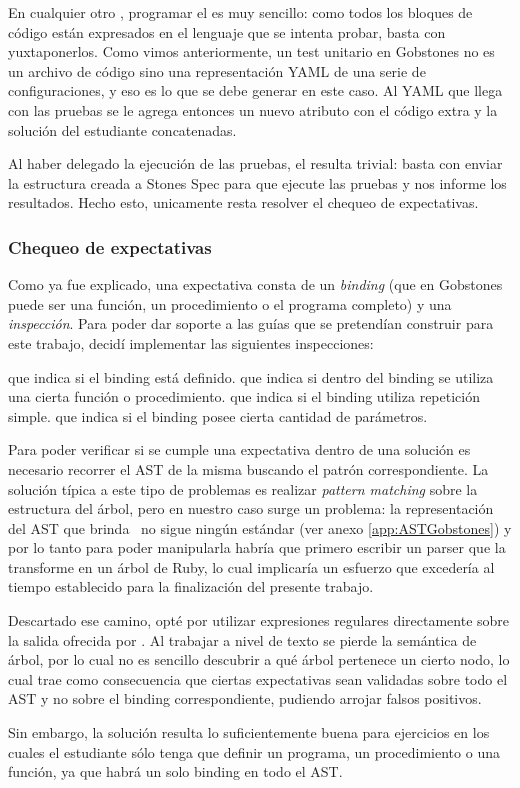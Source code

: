 En cualquier otro \runner, programar el  es muy sencillo: como todos los bloques de código están expresados en el lenguaje que se intenta probar, basta con yuxtaponerlos. Como vimos anteriormente, un test unitario en Gobstones no es un archivo de código sino una representación YAML de una serie de configuraciones, y eso es lo que se debe generar en este caso. Al YAML que llega con las pruebas se le agrega entonces un nuevo atributo  con el código extra y la solución del estudiante concatenadas.

Al haber delegado la ejecución de las pruebas, el  resulta trivial: basta con enviar la estructura creada a Stones Spec para que ejecute las pruebas y nos informe los resultados. Hecho esto, unicamente resta resolver el chequeo de expectativas.

\subsubsection{Chequeo de expectativas}
Como ya fue explicado, una expectativa consta de un \emph{binding} (que en Gobstones puede ser una función, un procedimiento o el programa completo) y una \emph{inspección}. Para poder dar soporte a las guías que se pretendían construir para este trabajo, decidí implementar las siguientes inspecciones:

\begin{itemize}
   que indica si el binding está definido.
   que indica si dentro del binding se utiliza una cierta función o procedimiento.
   que indica si el binding utiliza repetición simple.
   que indica si el binding posee cierta cantidad de parámetros.
\end{itemize}

Para poder verificar si se cumple una expectativa dentro de una solución es necesario recorrer el AST de la misma buscando el patrón correspondiente. La solución típica a este tipo de problemas es realizar \emph{pattern matching} sobre la estructura del árbol, pero en nuestro caso surge un problema: la representación del AST que brinda \pyGob\ no sigue ningún estándar (ver anexo \ref{app:ASTGobstones}) y por lo tanto para poder manipularla habría que primero escribir un parser que la transforme en un árbol de Ruby, lo cual implicaría un esfuerzo que excedería al tiempo establecido para la finalización del presente trabajo.

Descartado ese camino, opté por utilizar expresiones regulares directamente sobre la salida ofrecida por \pyGob. Al trabajar a nivel de texto se pierde la semántica de árbol, por lo cual no es sencillo descubrir a qué árbol pertenece un cierto nodo, lo cual trae como consecuencia que ciertas expectativas sean validadas sobre todo el AST y no sobre el binding correspondiente, pudiendo arrojar falsos positivos.

Sin embargo, la solución resulta lo suficientemente buena para ejercicios en los cuales el estudiante sólo tenga que definir un programa, un procedimiento o una función, ya que habrá un solo binding en todo el AST.
